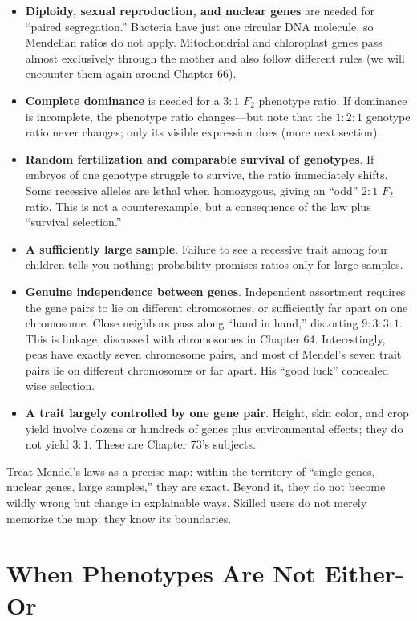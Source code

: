\begin{itemize}[itemsep=2pt]
\item \textbf{Diploidy, sexual reproduction, and nuclear genes} are needed for ``paired segregation.'' Bacteria have just one circular DNA molecule, so Mendelian ratios do not apply. Mitochondrial and chloroplast genes pass almost exclusively through the mother and also follow different rules (we will encounter them again around Chapter 66).
\item \textbf{Complete dominance} is needed for a $3:1$ $F_2$ phenotype ratio. If dominance is incomplete, the phenotype ratio changes---but note that the $1:2:1$ genotype ratio never changes; only its visible expression does (more next section).
\item \textbf{Random fertilization and comparable survival of genotypes}. If embryos of one genotype struggle to survive, the ratio immediately shifts. Some recessive alleles are lethal when homozygous, giving an ``odd'' $2:1$ $F_2$ ratio. This is not a counterexample, but a consequence of the law plus ``survival selection.''
\item \textbf{A sufficiently large sample}. Failure to see a recessive trait among four children tells you nothing; probability promises ratios only for large samples.
\item \textbf{Genuine independence between genes}. Independent assortment requires the gene pairs to lie on different chromosomes, or sufficiently far apart on one chromosome. Close neighbors pass along ``hand in hand,'' distorting $9:3:3:1$. This is linkage, discussed with chromosomes in Chapter 64. Interestingly, peas have exactly seven chromosome pairs, and most of Mendel's seven trait pairs lie on different chromosomes or far apart. His ``good luck'' concealed wise selection.
\item \textbf{A trait largely controlled by one gene pair}. Height, skin color, and crop yield involve dozens or hundreds of genes plus environmental effects; they do not yield $3:1$. These are Chapter 73's subjects.
\end{itemize}

Treat Mendel's laws as a precise map: within the territory of ``single genes, nuclear genes, large samples,'' they are exact. Beyond it, they do not become wildly wrong but change in explainable ways. Skilled users do not merely memorize the map: they know its boundaries.

\section{When Phenotypes Are Not Either-Or}

